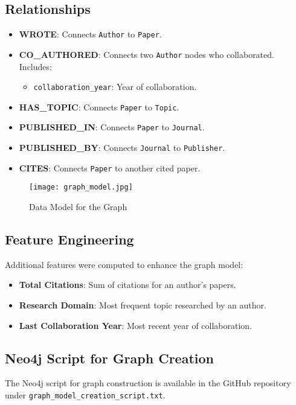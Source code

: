 \documentclass[conference, 12pt]{IEEEtran}
\begin{document}
\subsection{Relationships}
\begin{itemize}
    \item \textbf{WROTE}: Connects \texttt{Author} to \texttt{Paper}.
    \item \textbf{CO\_AUTHORED}: Connects two \texttt{Author} nodes who collaborated. Includes:
    \begin{itemize}
        \item \texttt{collaboration\_year}: Year of collaboration.
    \end{itemize}
    \item \textbf{HAS\_TOPIC}: Connects \texttt{Paper} to \texttt{Topic}.
    
    \item \textbf{PUBLISHED\_IN}: Connects \texttt{Paper} to \texttt{Journal}.
    \item \textbf{PUBLISHED\_BY}: Connects \texttt{Journal} to \texttt{Publisher}.
    \item \textbf{CITES}: Connects \texttt{Paper} to another cited paper.
\end{itemize}

\begin{figure}[h]
    \centering
    \texttt{[image: graph\_model.jpg]} 
    \caption{Data Model for the Graph}
    \label{fig:data_model}
\end{figure}

\subsection{Feature Engineering}
Additional features were computed to enhance the graph model:
\begin{itemize}
    \item \textbf{Total Citations}: Sum of citations for an author's papers.
    \item \textbf{Research Domain}: Most frequent topic researched by an author.
    \item \textbf{Last Collaboration Year}: Most recent year of collaboration.
\end{itemize}

\subsection{Neo4j Script for Graph Creation}
The Neo4j script for graph construction is available in the GitHub repository under \texttt{graph\_model\_creation\_script.txt}.
\end{document}
